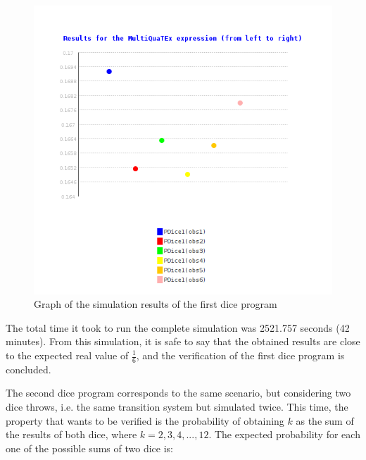 \begin{figure}[H]
    \centering
    \includegraphics[scale = 0.5]{images/CS2.png}
    \caption{Graph of the simulation results of the first dice program}
    \label{fig:ce2}
\end{figure}
The total time it took to run the complete simulation was 2521.757 seconds (42 minutes). From this simulation, it is safe to say that the obtained results are close to the expected real value of $\frac{1}{6}$, and the verification of the first dice program is concluded.

The second dice program corresponds to the same scenario, but considering two dice throws, i.e. the same transition system but simulated twice. This time, the property that wants to be verified is the probability of obtaining $k$ as the sum of the results of both dice, where $k = 2,3,4,...,12$. The expected probability for each one of the possible sums of two dice is:


